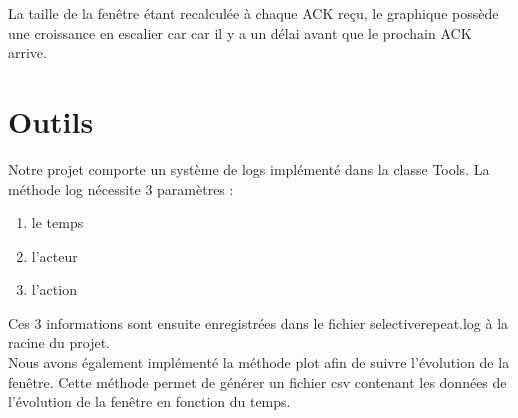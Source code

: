 \documentclass{article}
\begin{document}
La taille de la fenêtre étant recalculée à chaque ACK reçu, le graphique possède une croissance en escalier car car il y a un délai avant que le prochain ACK arrive. 

\section{Outils}

Notre projet comporte un système de logs implémenté dans la classe Tools.
La méthode log nécessite 3 paramètres : 
\begin{enumerate}
\item le temps
\item l'acteur
\item l'action
\end{enumerate}
Ces 3 informations sont ensuite enregistrées dans le fichier selectiverepeat.log à la racine du projet.\\
Nous avons également implémenté la méthode plot afin de suivre l'évolution de la fenêtre.
Cette méthode permet de générer un fichier csv contenant les données de l'évolution de la fenêtre en fonction du temps. 
\end{document}
